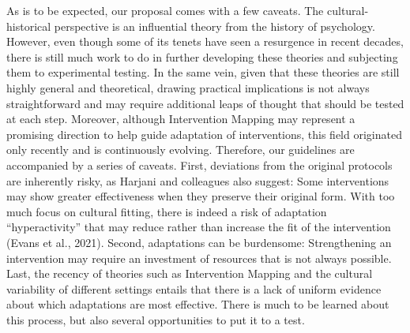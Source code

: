 \documentclass[authordate, reflection]{jote-new-article}
\begin{document}
	As is to be expected, our proposal comes with a few caveats. The cultural-historical perspective is an influential theory from the history of psychology. However, even though some of its tenets have seen a resurgence in recent decades, there is still much work to do in further developing these theories and subjecting them to experimental testing. In the same vein, given that these theories are still highly general and theoretical, drawing practical implications is not always straightforward and may require additional leaps of thought that should be tested at each step. Moreover, although Intervention Mapping may represent a promising direction to help guide adaptation of interventions, this field originated only recently and is continuously evolving. Therefore, our guidelines are accompanied by a series of caveats. First, deviations from the original protocols are inherently risky, as Harjani and colleagues also suggest: Some interventions may show greater effectiveness when they preserve their original form. With too much focus on cultural fitting, there is indeed a risk of adaptation “hyperactivity” that may reduce rather than increase the fit of the intervention (Evans et al., 2021). Second, adaptations can be burdensome: Strengthening an intervention may require an investment of resources that is not always possible. Last, the recency of theories such as Intervention Mapping and the cultural variability of different settings entails that there is a lack of uniform evidence about which adaptations are most effective. There is much to be learned about this process, but also several opportunities to put it to a test.
\end{document}
